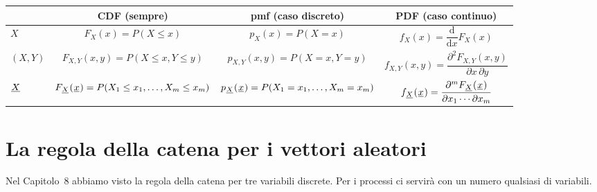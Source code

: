 \begin{center}
\renewcommand{\arraystretch}{1.9}
\begin{tabular}{@{}lccc@{}}
  \toprule
  & CDF (sempre) & pmf (caso discreto) & PDF (caso continuo) \\ \midrule
  $X$ & $F_X(x) = P(X \leq x)$ & $p_X(x) = P(X = x)$ & $f_X(x) = \dfrac{\mathrm{d}}{\mathrm{d}x} F_X(x)$ \\
  $(X, Y)$ & $F_{X,Y}(x, y) = P(X \leq x, Y \leq y)$ & $p_{X,Y}(x, y) = P(X = x, Y = y)$ &
  $f_{X,Y}(x, y) = \dfrac{\partial^2 F_{X,Y}(x, y)}{\partial x\, \partial y}$ \\
  ${\mkern1mu\underline{X}\mkern1mu}$ & $F_{{\mkern1mu\underline{X}\mkern1mu}}({\mkern1mu\underline{x}\mkern1mu}) = P(X_1 \leq x_1, \ldots, X_m \leq x_m)$ & $p_{{\mkern1mu\underline{X}\mkern1mu}}({\mkern1mu\underline{x}\mkern1mu}) = P(X_1 = x_1,
  \ldots, X_m = x_m)$ & $f_{{\mkern1mu\underline{X}\mkern1mu}}({\mkern1mu\underline{x}\mkern1mu}) = \dfrac{\partial^m F_{{\mkern1mu\underline{X}\mkern1mu}}({\mkern1mu\underline{x}\mkern1mu})}{\partial x_1 \cdots
  \partial x_m}$ \\ \bottomrule
\end{tabular}
\end{center}

\section{La regola della catena per i vettori aleatori}

Nel Capitolo~8 abbiamo visto la regola della catena per tre variabili discrete. Per i processi ci servirà con un numero
qualsiasi di variabili.


